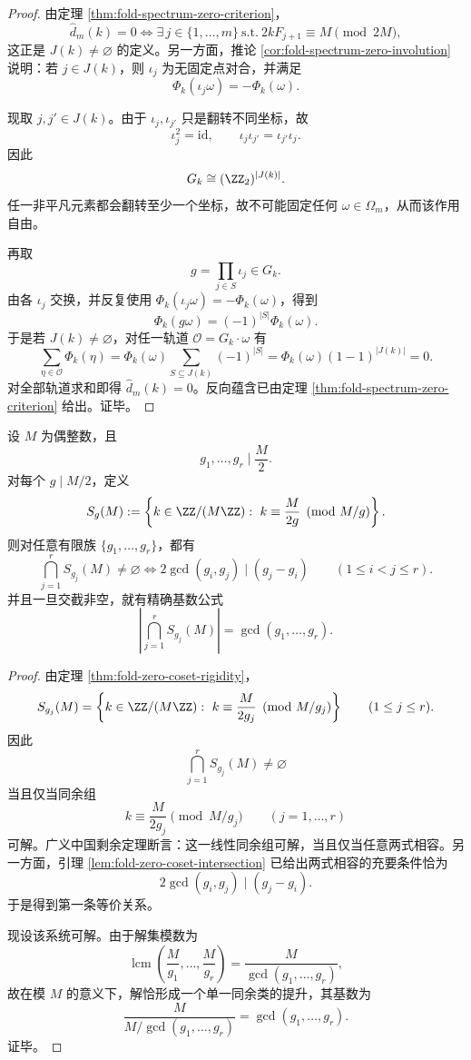 \begin{proof}
由定理 \ref{thm:fold-spectrum-zero-criterion}，
\[
\widehat d_m(k)=0
\iff
\exists\,j\in\{1,\dots,m\}\ \text{s.t.}\ 2kF_{j+1}\equiv M\pmod{2M},
\]
这正是 \(J(k)\neq\varnothing\) 的定义。另一方面，推论 \ref{cor:fold-spectrum-zero-involution} 说明：若 \(j\in J(k)\)，则 \(\iota_j\) 为无固定点对合，并满足
\[
\Phi_k(\iota_j\omega)=-\Phi_k(\omega).
\]

现取 \(j,j'\in J(k)\)。由于 \(\iota_j,\iota_{j'}\) 只是翻转不同坐标，故
\[
\iota_j^2=\mathrm{id},
\qquad
\iota_j\iota_{j'}=\iota_{j'}\iota_j.
\]
因此
\[
G_k\cong(\ZZ_2)^{|J(k)|}.
\]
任一非平凡元素都会翻转至少一个坐标，故不可能固定任何 \(\omega\in\Omega_m\)，从而该作用自由。

再取
\[
g=\prod_{j\in S}\iota_j\in G_k.
\]
由各 \(\iota_j\) 交换，并反复使用 \(\Phi_k(\iota_j\omega)=-\Phi_k(\omega)\)，得到
\[
\Phi_k(g\omega)=(-1)^{|S|}\Phi_k(\omega).
\]
于是若 \(J(k)\neq\varnothing\)，对任一轨道 \(\mathcal O=G_k\cdot \omega\) 有
\[
\sum_{\eta\in\mathcal O}\Phi_k(\eta)
=
\Phi_k(\omega)\sum_{S\subseteq J(k)}(-1)^{|S|}
=
\Phi_k(\omega)(1-1)^{|J(k)|}
=
0.
\]
对全部轨道求和即得 \(\widehat d_m(k)=0\)。反向蕴含已由定理 \ref{thm:fold-spectrum-zero-criterion} 给出。证毕。
\end{proof}

\begin{theorem}[零余类族的任意有限交截由两两兼容性完全控制]\label{thm:xi-time-part71-zero-coset-finite-intersection-pairwise-compatibility}
设 \(M\) 为偶整数，且
\[
g_1,\dots,g_r\mid \frac{M}{2}.
\]
对每个 \(g\mid M/2\)，定义
\[
S_g(M):=
\left\{
k\in \ZZ/(M\ZZ):
\ k\equiv \frac{M}{2g}\pmod{M/g}
\right\}.
\]
则对任意有限族 \(\{g_1,\dots,g_r\}\)，都有
\[
\bigcap_{j=1}^{r}S_{g_j}(M)\neq\varnothing
\iff
2\gcd(g_i,g_j)\mid (g_j-g_i)
\qquad
(1\le i<j\le r).
\]
并且一旦交截非空，就有精确基数公式
\[
\left|
\bigcap_{j=1}^{r}S_{g_j}(M)
\right|
=
\gcd(g_1,\dots,g_r).
\]
\end{theorem}
\begin{proof}
由定理 \ref{thm:fold-zero-coset-rigidity}，
\[
S_{g_j}(M)
=
\left\{
k\in \ZZ/(M\ZZ):
\ k\equiv \frac{M}{2g_j}\pmod{M/g_j}
\right\}
\qquad (1\le j\le r).
\]
因此
\[
\bigcap_{j=1}^{r}S_{g_j}(M)\neq\varnothing
\]
当且仅当同余组
\[
k\equiv \frac{M}{2g_j}\pmod{M/g_j}
\qquad (j=1,\dots,r)
\]
可解。广义中国剩余定理断言：这一线性同余组可解，当且仅当任意两式相容。另一方面，引理 \ref{lem:fold-zero-coset-intersection} 已给出两式相容的充要条件恰为
\[
2\gcd(g_i,g_j)\mid (g_j-g_i).
\]
于是得到第一条等价关系。

现设该系统可解。由于解集模数为
\[
\operatorname{lcm}\!\left(\frac{M}{g_1},\dots,\frac{M}{g_r}\right)
=
\frac{M}{\gcd(g_1,\dots,g_r)},
\]
故在模 \(M\) 的意义下，解恰形成一个单一同余类的提升，其基数为
\[
\frac{M}{M/\gcd(g_1,\dots,g_r)}
=
\gcd(g_1,\dots,g_r).
\]
证毕。
\end{proof}

